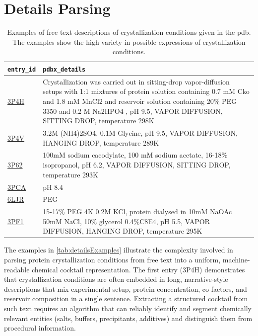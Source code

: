 \section{Details Parsing}\label{sec:data/data_parsing}
\begin{table}[h!]
	\centering
	\begin{tabularx}{\linewidth}{lX}
		\toprule
		\texttt{entry\_id} & \texttt{pdbx\_details}\\
		\midrule
		\href{https://www.rcsb.org/structure/3P4H}{3P4H} & Crystallization was carried out in sitting-drop vapor-diffusion setups with 1:1 mixtures of protein solution containing 0.7 mM Cko and 1.8 mM MnCl2 and reservoir solution containing 20\% PEG 3350 and 0.2 M Na2HPO4 , pH 9.5, VAPOR DIFFUSION, SITTING DROP, temperature 298K
		\\
		\href{https://www.rcsb.org/structure/3P4V}{3P4V} & 3.2M (NH4)2SO4, 0.1M Glycine, pH 9.5, VAPOR DIFFUSION, HANGING DROP, temperature 289K \\
		\href{https://www.rcsb.org/structure/3P62}{3P62} & 100mM sodium cacodylate, 100 mM sodium acetate, 16-18\% isopropanol, pH 6.2, VAPOR DIFFUSION, SITTING DROP, temperature 293K \\
		\href{https://www.rcsb.org/structure/3PCA}{3PCA} & pH 8.4 \\
		\href{https://www.rcsb.org/structure/6LJR}{6LJR} & PEG \\
		\href{https://www.rcsb.org/structure/3PF1}{3PF1} & 15-17\% PEG 4K 0.2M KCl, protein dialysed in 10mM NaOAc 50mM NaCl, 10\% glycerol 0.4\%C8E4, pH 5.5, VAPOR DIFFUSION, HANGING DROP, temperature 295K
		\\
		\bottomrule
	\end{tabularx}	
	\caption[Crystallization condition free text examples]{Examples of free text descriptions of crystallization conditions given in the \gls{pdb}. The examples show the high variety in possible expressions of crystallization conditions.}
	\label{tab:detailsExamples}
\end{table}

The examples in \autoref{tab:detailsExamples} illustrate the complexity involved in parsing protein crystallization conditions from free text into a uniform, machine-readable chemical cocktail representation. The first entry (3P4H) demonstrates that crystallization conditions are often embedded in long, narrative-style descriptions that mix experimental setup, protein concentration, co-factors, and reservoir composition in a single sentence. Extracting a structured cocktail from such text requires an algorithm that can reliably identify and segment chemically relevant entities (salts, buffers, precipitants, additives) and distinguish them from procedural information.

